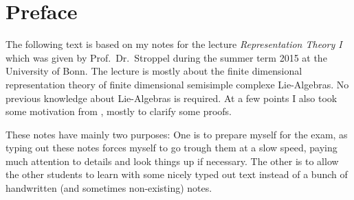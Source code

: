 \chapter{Preface}

The following text is based on my notes for the lecture \emph{Representation Theory I} which was given by Prof.\ Dr.\ Stroppel during the summer term 2015 at the University of Bonn. The lecture is mostly about the finite dimensional representation theory of finite dimensional semisimple complexe Lie-Algebras. No previous knowledge about Lie-Algebras is required. At a few points I also took some motivation from \cite{Humphreys}, mostly to clarify some proofs.

These notes have mainly two purposes: One is to prepare myself for the exam, as typing out these notes forces myself to go trough them at a slow speed, paying much attention to details and look things up if necessary. The other is to allow the other students to learn with some nicely typed out text instead of a bunch of handwritten (and sometimes non-existing) notes.